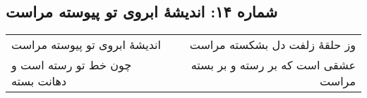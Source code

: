 \begin{center}
\section*{شماره ۱۴: اندیشۀ ابروی تو پیوسته مراست}
\label{sec:014}
\begin{longtable}{l p{0.5cm} r}
اندیشهٔ ابروی تو پیوسته مراست
&&
وز حلقهٔ زلفت دل بشکسته مراست
\\
چون خط تو رسته است و دهانت بسته
&&
عشقی است که بر رسته و بر بسته مراست
\\
\end{longtable}
\end{center}
